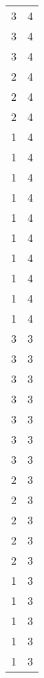 \begin{tabular}{rr}
                  3 &             4 \\
                  3 &             4 \\
                  3 &             4 \\
                  2 &             4 \\
                  2 &             4 \\
                  2 &             4 \\
                  1 &             4 \\
                  1 &             4 \\
                  1 &             4 \\
                  1 &             4 \\
                  1 &             4 \\
                  1 &             4 \\
                  1 &             4 \\
                  1 &             4 \\
                  1 &             4 \\
                  1 &             4 \\
                  3 &             3 \\
                  3 &             3 \\
                  3 &             3 \\
                  3 &             3 \\
                  3 &             3 \\
                  3 &             3 \\
                  3 &             3 \\
                  2 &             3 \\
                  2 &             3 \\
                  2 &             3 \\
                  2 &             3 \\
                  2 &             3 \\
                  1 &             3 \\
                  1 &             3 \\
                  1 &             3 \\
                  1 &             3 \\
                  1 &             3 \\

\end{tabular}

